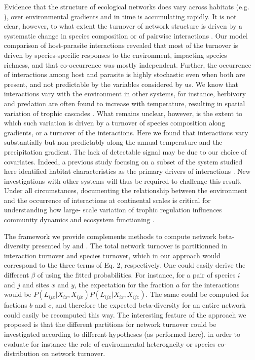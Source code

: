 \documentclass[12pt]{article}
\begin{document}
Evidence that the structure of ecological networks does vary across habitats
(e.g. \citealt{Tylianakis2007}), over environmental gradients
\citep{Lurgi2012} and in time \citep{Simanonok2014} is accumulating
rapidly. It is not clear, however, to what extent the turnover of network
structure is driven by a systematic change in species composition or of
pairwise interactions \citep{Poisot2012, Poisot2015a}. Our model comparison of
host-parasite interactions revealed that most of the turnover is driven by
species-specific responses to the environment, impacting species richness, and
that co-occurrence was mostly independent. Further, the occurrence of interactions
among host and parasite is highly stochastic even when both are present, and
not predictable by the variables considered by us. We know that interactions
vary with the environment in other systems, for instance, herbivory
\citep{Shurin2012, Baskett2018} and predation \citep{Mckinnon2010,
Legagneux2014} are often found to increase with temperature, resulting in
spatial variation of trophic cascades \citep{Gray2016}. What remains unclear,
however, is the extent to which such variation is driven by a turnover of
species composition along gradients, or a turnover of the interactions. Here
we found that interactions vary substantially but non-predictably along the
annual temperature and the precipitation gradient. The lack of detectable
signal may be due to our choice of covariates. Indeed, a previous study focusing on a subset of the system studied here identified habitat characteristics as the primary drivers of
interactions \citep{Nyman2015}. New investigations with other systems will
thus be required to challenge this result. Under all circumstances,
documenting the relationship between the environment and the occurrence of
interactions at continental scales is critical for understanding how large-
scale variation of trophic regulation influences community dynamics and
ecosystem functioning \citep{Harfoot2014}.

The framework we provide complements methods to compute network beta-
diversity presented by \citealt{Poisot2012} and \citealt{Poisot2018}. The total
network turnover is partitionned in interaction turnover and species
turnover, which in our approach would correspond to the three terms of Eq. 2,
respectively. One could easily derive the different $\beta$ of
\citealt{Poisot2012} using the fitted probabilities. For instance, for a pair
of species $i$ and $j$ and sites $x$ and $y$, the expectation for the
fraction $a$ for the interactions would be
$P(L_{ijx}|X_{ix},X_{ijx})P(L_{ijx}|X_{ix},X_{ijx})$. The same could be
computed for factions $b$ and $c$, and therefore the expected beta-diversity
for an entire network could easily be recomputed this way. The interesting
feature of the approach we proposed is that the different partitions for
network turnover could be investigated according to different hypotheses (as
performed here), in order to evaluate for instance the role of environmental
heterogneity or species co-distribution on network turnover.
\end{document}
